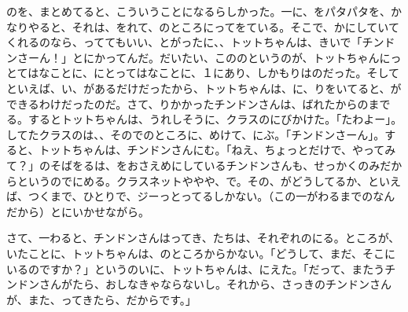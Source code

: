 のを、まとめてると、こういうことになるらしかった。一に、をパタパタを、かなりやると、それは、をれて、のところにってをている。そこで、かにしていてくれるのなら、っててもいい、とがったに、、トットちゃんは、きいで「チンドンさーん！」とにかってんだ。だいたい、こののというのが、トットちゃんにっとてはなことに、にとってはなことに、１にあり、しかもりはのだった。そしてといえば、い、があるだけだったから、トットちゃんは、に、りをいてると、ができるわけだったのだ。さて、りかかったチンドンさんは、ばれたからのまでる。するとトットちゃんは、うれしそうに、クラスのにびかけた。「たわよー」。してたクラスのは、、そのでのところに、めけて、にぶ。「チンドンさーん」。すると、トットちゃんは、チンドンさんにむ。「ねえ、ちょっとだけで、やってみて？」のそばをるは、をおさえめにしているチンドンさんも、せっかくのみだからというのでにめる。クラスネットややや、で。その、がどうしてるか、といえば、つくまで、ひとりで、ジーっとってるしかない。（この一がわるまでのなんだから）とにいかせながら。

さて、一わると、チンドンさんはってき、たちは、それぞれのにる。ところが、いたことに、トットちゃんは、のところからかない。「どうして、まだ、そこにいるのですか？」というのいに、トットちゃんは、にえた。「だって、またうチンドンさんがたら、おしなきゃならないし。それから、さっきのチンドンさんが、また、ってきたら、だからです。」


